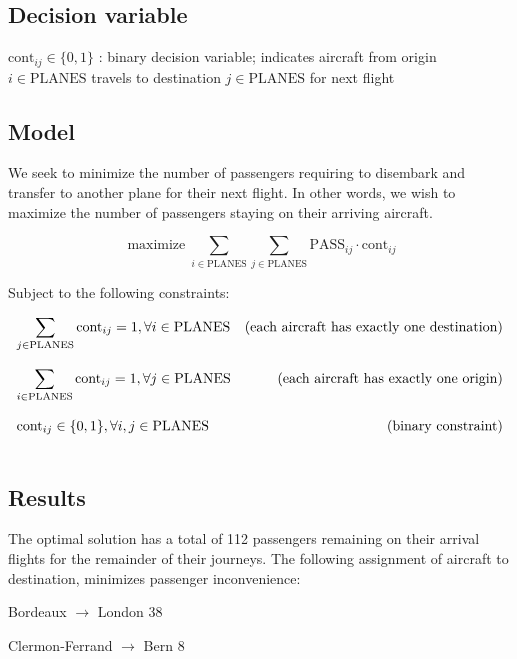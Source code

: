 \documentclass[8pt,oneside]{extarticle}
\DeclareMathOperator*{\maximize}{maximize}
\begin{document}
\subsection{Decision variable}

$\mathrm{cont}_{ij} \in\lbrace 0, 1\rbrace $ : binary decision variable; indicates aircraft
    from origin $i\in\mathrm{PLANES}$ travels to destination $j\in\mathrm{PLANES}$ for next flight

\subsection{Model}

We seek to minimize the number of passengers requiring to disembark and transfer to another plane for their
next flight. In other words, we wish to maximize the number of passengers staying on their arriving aircraft.

$$
\maximize \sum_{i\in\mathrm{PLANES}}\sum_{j\in\mathrm{PLANES}} \mathrm{PASS}_{ij}\cdot\mathrm{cont}_{ij}
$$

Subject to the following constraints:

$$
\begin{array}{lr}
    \displaystyle
    \sum_{j\in\mathrm{PLANES}} \mathrm{cont}_{ij} = 1,\forall i \in\mathrm{PLANES}
    & \text{(each aircraft has exactly one destination)}
    \bigskip\\

    \displaystyle
    \sum_{i\in\mathrm{PLANES}} \mathrm{cont}_{ij} = 1,\forall j \in\mathrm{PLANES}
    & \text{(each aircraft has exactly one origin)}
    \bigskip\\

    \displaystyle
    \mathrm{cont}_{ij} \in\lbrace 0, 1\rbrace, \forall i, j \in\mathrm{PLANES}
    &\text{(binary constraint)}
    \bigskip \\
\end{array}
$$

\subsection{Results}

The optimal solution has a total of 112 passengers remaining on their arrival flights for the
remainder of their journeys. The following assignment of aircraft to destination, minimizes passenger
inconvenience:
\medskip

Bordeaux $\rightarrow$ London 38

Clermon-Ferrand $\rightarrow$ Bern 8
\end{document}
